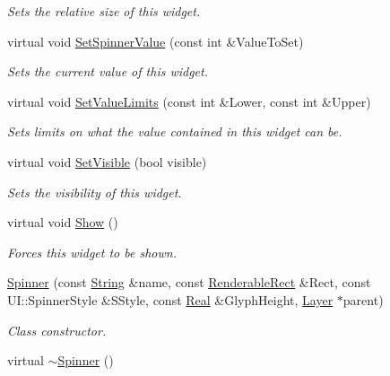 \begin{DoxyCompactItemize}
\begin{DoxyCompactList}\small\item\em Sets the relative size of this widget. \item\end{DoxyCompactList}\item 
virtual void \hyperlink{classphys_1_1UI_1_1Spinner_a7943087a7b61ec2ac7dcb7acab0e5345}{SetSpinnerValue} (const int \&ValueToSet)
\begin{DoxyCompactList}\small\item\em Sets the current value of this widget. \item\end{DoxyCompactList}\item 
virtual void \hyperlink{classphys_1_1UI_1_1Spinner_a933ec4a012ee5406b5ec576b0585a9c9}{SetValueLimits} (const int \&Lower, const int \&Upper)
\begin{DoxyCompactList}\small\item\em Sets limits on what the value contained in this widget can be. \item\end{DoxyCompactList}\item 
virtual void \hyperlink{classphys_1_1UI_1_1Spinner_a4fddc28f38174c4a89761efa00ae88c3}{SetVisible} (bool visible)
\begin{DoxyCompactList}\small\item\em Sets the visibility of this widget. \item\end{DoxyCompactList}\item 
\hypertarget{classphys_1_1UI_1_1Spinner_ac30c60ae55de67078a09c2d996a694fa}{
virtual void \hyperlink{classphys_1_1UI_1_1Spinner_ac30c60ae55de67078a09c2d996a694fa}{Show} ()}
\label{classphys_1_1UI_1_1Spinner_ac30c60ae55de67078a09c2d996a694fa}

\begin{DoxyCompactList}\small\item\em Forces this widget to be shown. \item\end{DoxyCompactList}\item 
\hyperlink{classphys_1_1UI_1_1Spinner_ad82c8fa511a4df09aaa4c7f5872bd5ed}{Spinner} (const \hyperlink{namespacephys_aa03900411993de7fbfec4789bc1d392e}{String} \&name, const \hyperlink{structphys_1_1UI_1_1RenderableRect}{RenderableRect} \&Rect, const UI::SpinnerStyle \&SStyle, const \hyperlink{namespacephys_af7eb897198d265b8e868f45240230d5f}{Real} \&GlyphHeight, \hyperlink{classphys_1_1UI_1_1Layer}{Layer} $\ast$parent)
\begin{DoxyCompactList}\small\item\em Class constructor. \item\end{DoxyCompactList}\item 
\hypertarget{classphys_1_1UI_1_1Spinner_adc7629a1ef57ef62a4e453ce3c66d808}{
virtual \hyperlink{classphys_1_1UI_1_1Spinner_adc7629a1ef57ef62a4e453ce3c66d808}{$\sim$Spinner} ()}
\label{classphys_1_1UI_1_1Spinner_adc7629a1ef57ef62a4e453ce3c66d808}


\end{DoxyCompactItemize}
